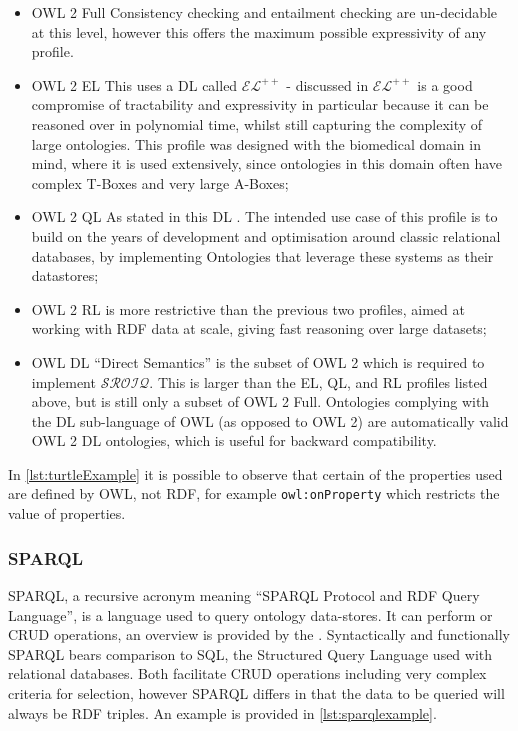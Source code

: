 \begin{itemize}
    \item OWL 2 Full Consistency checking and entailment checking are un-decidable at this level, however this offers the maximum possible expressivity of any profile. 
    \item OWL 2 EL This uses a DL called \(\mathcal{EL}^{++}\) - discussed in \citet{Baader2005} \(\mathcal{EL}^{++}\) is a good compromise of tractability and expressivity in particular because it can be reasoned over in polynomial time, whilst still capturing the complexity of large ontologies. This profile was designed with the biomedical domain in mind, where it is used extensively, since ontologies in this domain often have complex T-Boxes and very large A-Boxes;
    \item OWL 2 QL As stated in \citep{Parsia12} this DL . The intended use case of this profile is to build on the years of development and optimisation around classic relational databases, by implementing Ontologies that leverage these systems as their datastores;
    \item OWL 2 RL is more restrictive than the previous two profiles, aimed at working with RDF data at scale, giving fast reasoning over large datasets;
    \item OWL DL ``Direct Semantics'' is the subset of OWL 2 which is required to implement \(\mathcal{SROIQ}\). This is larger than the EL, QL, and RL profiles listed above, but is still only a subset of OWL 2 Full. Ontologies complying with the DL sub-language of OWL (as opposed to OWL 2) are automatically valid OWL 2 DL ontologies, which is useful for backward compatibility. 
\end{itemize}

In \autoref{lst:turtleExample} it is possible to observe that certain of the properties used are defined by OWL, not RDF, for example \texttt{owl:onProperty} which restricts the value of properties. 

\subsubsection{SPARQL}
\label{sec:lit_rv_sparql}
SPARQL, a recursive acronym meaning ``SPARQL Protocol and RDF Query Language'', is a language used to query ontology data-stores. It can perform   or CRUD operations, an overview is provided by the \citet{5403219}. Syntactically and functionally SPARQL bears comparison to SQL, the Structured Query Language used with relational databases. Both facilitate CRUD operations including very complex criteria for selection, however SPARQL differs in that the data to be queried will always be RDF triples. An example is provided in \autoref{lst:sparqlexample}.

